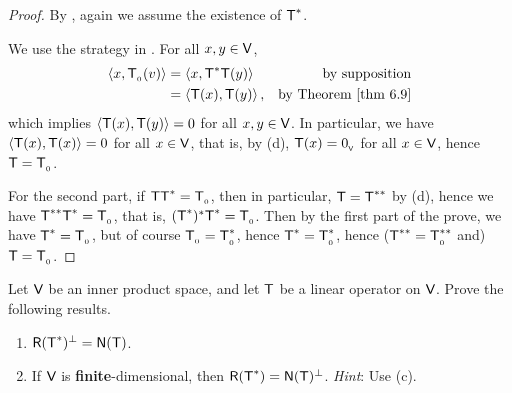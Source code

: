 \begin{proof}
By , again we assume the existence of \(\textsf{T}^*\).

We use the strategy in .
For all \(x, y \in \textsf{V}\),
\begin{align*}
    \LG x, \TZERO(v) \RG & = \LG x, \T^*\T(y) \RG & \text{by supposition} \\
        & = \LG \T(x), \T(y) \RG, & \text{by \THM{6.9}}
\end{align*}
which implies \(\left< \textsf{T}(x), \textsf{T}(y) \right> = 0\) for all \(x, y \in \textsf{V}\).
In particular, we have \(\left< \textsf{T}(x), \textsf{T}(x) \right> = 0\) for all \(x \in \textsf{V}\), that is, by (d), \(\textsf{T}(x) = 0_{_{\textsf{V}}}\) for all \(x \in \textsf{V}\), hence \(\textsf{T} = \textsf{T}_{_0}\).

For the second part, if \(\textsf{T}\textsf{T}^* = \textsf{T}_{_0}\), then in particular, \(\textsf{T} = \textsf{T}^{**}\) by (d), hence we have \(\textsf{T}^{**} \textsf{T}^* = \textsf{T}_{_0}\), that is, \((\textsf{T}^*)^* \textsf{T}^* = \textsf{T}_{_0}\).
Then by the first part of the prove, we have \(\textsf{T}^* = \textsf{T}_{_0}\), but of course \(\textsf{T}_{_0} = \textsf{T}_{_0}^*\), hence \(\textsf{T}^* = \textsf{T}_{_0}^*\), hence (\(\textsf{T}^{**} = \textsf{T}_{_0}^{**}\) and) \(\textsf{T} = \textsf{T}_{_0}\).
\end{proof}

\begin{exercise} \label{exercise 6.3.12}
Let \(\textsf{V}\) be an inner product space, and let \(\textsf{T}\) be a linear operator on \(\textsf{V}\).
Prove the following results.
\begin{enumerate}
\item \(\textsf{R}(\textsf{T}^*)^{\perp} = \textsf{N}(\textsf{T})\).
\item If \(\textsf{V}\) is \textbf{finite}-dimensional, then \(\textsf{R}(\textsf{T}^*) = \textsf{N}(\textsf{T})^{\perp}\).
\emph{Hint}: Use (c).
\end{enumerate}
\end{exercise}

